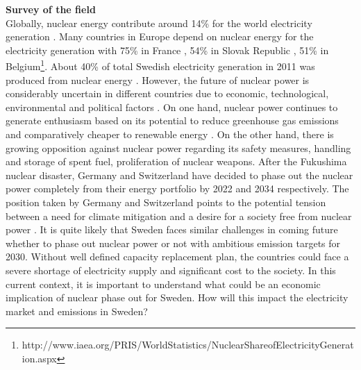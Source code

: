 \begin{comment}
Question 3:
Cost of disposal of nuclear waste
I oktober 2011 föreslog SSM en höjning av den avgift kärnkraftsindustrin betalar till Kärnavfallsfonden från cirka 1 öre/kWh producerad kärnkraftsel till cirka 3 öre/kWh. Den 22 december 2011 beslutade regeringen att endast höja avgiften till 2,2 öre/kWh. Under 2013 meddelade Kärnavfallsfonden att det ändå saknas över 30 miljarder kronor för att de avsatta pengarna ska räcka till slutförvaret av det svenska kärnavfallet. Enligt en uträkning som Sveriges Radio Vetenskapsradion låtit göra skulle avgiften behöva femfaldigas till runt 10 öre/kWh för att täcka upp underskottet i Kärnavfallsfonden.
\end{comment}


\textbf{Survey of the field}\\
Globally, nuclear energy contribute around 14\% for the world electricity generation \citep{OECD2012}. Many countries in Europe depend on nuclear energy for the electricity generation with 75\% in France , 54\% in Slovak Republic , 51\% in Belgium\footnote{http://www.iaea.org/PRIS/WorldStatistics/NuclearShareofElectricityGeneration.aspx}. About 40\% of total Swedish electricity generation in 2011 was produced from nuclear energy \citep{SEA2012}. However, the future of nuclear power is considerably uncertain in different countries due to economic, technological, environmental and political factors \citep{Joskow2012}. On one hand, nuclear power continues to generate enthusiasm based on its potential to reduce greenhouse gas emissions and comparatively cheaper to renewable energy \citep{Davis2012, Renssen2013}. On the other hand, there is growing opposition against nuclear power regarding its safety measures, handling and storage of spent fuel, proliferation of nuclear weapons. After the Fukushima nuclear disaster, Germany and Switzerland have decided to phase out the nuclear power completely from their energy portfolio by  2022 and 2034 respectively. The position taken by Germany and Switzerland points to the potential tension between a need for climate mitigation and a desire for a society free from nuclear power \citep{Glomsrod2013}. It is quite likely that Sweden faces similar challenges in coming future whether to phase out nuclear power or not with ambitious emission targets for 2030. Without well defined capacity replacement plan, the countries could face a severe shortage of electricity supply and significant cost to the society. In this current context, it is important to understand what could be an economic implication of nuclear phase out for Sweden. How will this impact the electricity market and emissions in Sweden?


